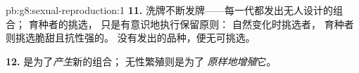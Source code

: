 \begin{solution}{pb:g8:sexual-reproduction:1}
\textbf{11.} 洗牌不断发牌——每一代都发出无人设计的组合；
育种者的挑选，
只是有意识地执行保留原则：
自然变化时挑选者，
育种者则挑选脆甜且抗性强的。
没有发出的品种，便无可挑选。

\textbf{12.} 是为了\emph{产生}新的组合；
无性繁殖则是为了
\emph{原样地增殖}它。
\end{solution}
